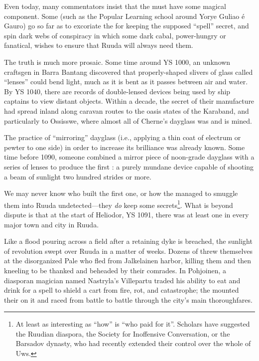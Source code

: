 \documentclass[12pt]{report}
\begin{document}
Even today, many commentators insist that the  must
have some magical component.  Some (such as the Popular Learning
school around Yorye Guliao \'{e} Gauro) go so far as to excoriate the
{\aemott} for keeping the supposed ``spell'' secret, and spin dark webs
of conspiracy in which some dark cabal, power-hungry or fanatical,
wishes to ensure that Ruuda will always need them.

The truth is much more prosaic.  Some time around YS 1000, an unknown
craftsgen in Barra Bantang discovered that properly-shaped slivers of
glass called ``lenses'' could bend light, much as it is bent as it
passes between air and water.  By YS 1040, there are records of
double-lensed devices being used by ship captains to view distant
objects.  Within a decade, the secret of their manufacture had spread
inland along caravan routes to the oasis states of the Karaband, and
particularly to Ossisswe, where almost all of Cherne's dayglass was
and is mined.

The practice of ``mirroring'' dayglass (i.e., applying a thin coat of
electrum or pewter to one side) in order to increase its brilliance
was already known.  Some time before 1090, someone combined a mirror
piece of noon-grade dayglass with a series of lenses to produce the
first : a purely mundane device capable of shooting
a beam of sunlight two hundred strides or more.

We may never know who built the first one, or how the {\aemott}
managed to smuggle them into Ruuda undetected---they \emph{do} keep
some secrets\footnote{At least as interesting as ``how'' is ``who paid
for it''.  Scholars have suggested the Ruudian diaspora, the Society
for Inoffensive Conversation, or the Barsadov dynasty, who had
recently extended their control over the whole of Uws.}.  What is
beyond dispute is that at the start of Heliodor, YS 1091, there was at
least one  in every major town and city in Ruuda.

Like a flood pouring across a field after a retaining dyke is
breached, the sunlight of revolution swept over Ruuda in a matter of
weeks.  Dozens of {\aemott} threw themselves at the disorganized Pale
who fled from Jalkelainen harbor, killing them and then kneeling to be
thanked and beheaded by their comrades.  In Pohjoinen, a diasporan
magician named Nastryla's Villepartu traded his ability to eat and
drink for a spell to shield a cart from fire, rot, and catastrophe;
the {\aemott} mounted their  on it and raced from
battle to battle through the city's main thoroughfares.
\end{document}
